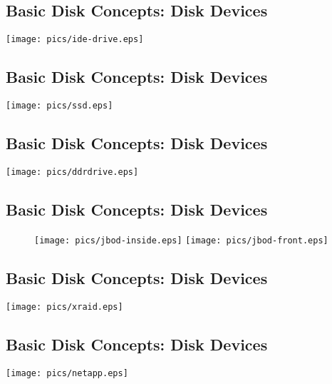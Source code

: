 \documentclass[xga]{xdvislides}
\begin{document}
\subsection{Basic Disk Concepts: Disk Devices}
	\begin{center}
		\texttt{[image: pics/ide-drive.eps]} \\
	\end{center}

\subsection{Basic Disk Concepts: Disk Devices}
	\begin{center}
		\texttt{[image: pics/ssd.eps]} \\
	\end{center}

\subsection{Basic Disk Concepts: Disk Devices}
	\begin{center}
		\texttt{[image: pics/ddrdrive.eps]} \\
	\end{center}

\subsection{Basic Disk Concepts: Disk Devices}
\begin{figure}[hb]
	\begin{center}
		\texttt{[image: pics/jbod-inside.eps]}
		\hspace*{15mm}
		\texttt{[image: pics/jbod-front.eps]} \\
	\end{center}
\end{figure}


\subsection{Basic Disk Concepts: Disk Devices}
	\begin{center}
		\texttt{[image: pics/xraid.eps]} \\
	\end{center}


\subsection{Basic Disk Concepts: Disk Devices}
	\begin{center}
		\texttt{[image: pics/netapp.eps]} \\
	\end{center}
\end{document}
